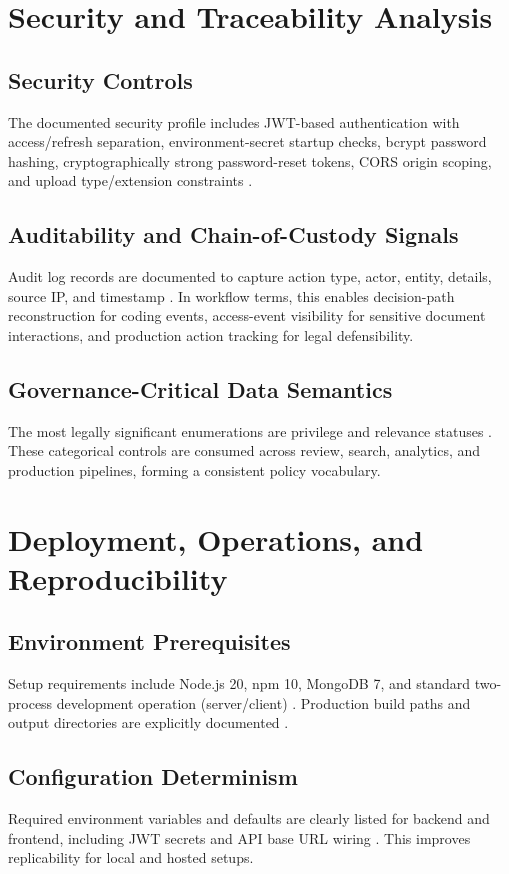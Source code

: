 \documentclass[conference]{IEEEtran}
\begin{document}
\section{Security and Traceability Analysis}
\subsection{Security Controls}
The documented security profile includes JWT-based authentication with access/refresh separation, environment-secret startup checks, bcrypt password hashing, cryptographically strong password-reset tokens, CORS origin scoping, and upload type/extension constraints \cite{arch,setup}.

\subsection{Auditability and Chain-of-Custody Signals}
Audit log records are documented to capture action type, actor, entity, details, source IP, and timestamp \cite{arch,roles}. In workflow terms, this enables decision-path reconstruction for coding events, access-event visibility for sensitive document interactions, and production action tracking for legal defensibility.

\subsection{Governance-Critical Data Semantics}
The most legally significant enumerations are privilege and relevance statuses \cite{roles}. These categorical controls are consumed across review, search, analytics, and production pipelines, forming a consistent policy vocabulary.

\section{Deployment, Operations, and Reproducibility}
\subsection{Environment Prerequisites}
Setup requirements include Node.js 20, npm 10, MongoDB 7, and standard two-process development operation (server/client) \cite{setup}. Production build paths and output directories are explicitly documented \cite{setup}.

\subsection{Configuration Determinism}
Required environment variables and defaults are clearly listed for backend and frontend, including JWT secrets and API base URL wiring \cite{setup}. This improves replicability for local and hosted setups.
\end{document}
